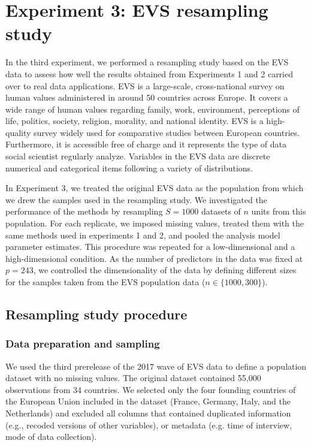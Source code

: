 \section{Experiment 3: EVS resampling study}

In the third experiment, we performed a resampling study based on the EVS data to assess
how well the results obtained from Experiments 1 and 2 carried over to real data applications.
EVS is a large-scale, cross-national survey on human values administered in around 50 countries
across Europe.
It covers a wide range of human values regarding family, work, environment, perceptions of 
life, politics, society, religion, morality, and national identity.
EVS is a high-quality survey widely used for comparative studies between European countries.
Furthermore, it is accessible free of charge and it represents the type of data social scientist 
regularly analyze.
Variables in the EVS data are discrete numerical and categorical items following a 
variety of distributions.

In Experiment 3, we treated the original EVS data as the population from which we drew the samples used in the resampling study.
We investigated the performance of the methods by resampling $S=1000$ datasets of $n$ units from this 
population.
For each replicate, we imposed missing values, treated them with the same methods used in 
experiments 1 and 2, and pooled the analysis model parameter estimates.
This procedure was repeated for a low-dimensional and a high-dimensional condition. 
As the number of predictors in the data was fixed at $p = 243$, we controlled the dimensionality of the data by defining different sizes for the samples taken from the EVS population data 
($n \in \{1000, 300\}$).

\subsection{Resampling study procedure} \label{resProc}

\subsubsection{Data preparation and sampling}
	We used the third prerelease of the 2017 wave of EVS data \citep{EVS:2017} to define a population dataset 
	with no missing values.
	The original dataset contained 55,000 observations from 34 countries.
	We selected only the four founding countries of the European Union included in the dataset (France, Germany,
	Italy, and the Netherlands) and excluded all columns that contained duplicated
	information (e.g., recoded versions of other variables), or metadata (e.g. time of interview,
	mode of data collection).

